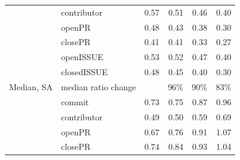 \documentclass[smallextended]{svjour3}
\begin{document}
\begin{table}[!t]
\begin{adjustbox}{max width=0.96\textwidth}
\begin{tabular}{llrrrr}
                              & contributor                                 & 0.57                                         & 0.51                          & 0.46                          & 0.40                          \\
                              & openPR                                      & 0.48                                         & 0.43                          & 0.38                          & 0.30                          \\
                              & closePR                                     & 0.41                                         & 0.41                          & 0.33                          & 0.27                          \\
                              & openISSUE                                   & 0.53                                         & 0.52                          & 0.47                          & 0.40                          \\
                              & closedISSUE                                 & 0.48                                         & 0.45                          & 0.40                          & 0.30                          \\
\multirow{-7}{*}{Median, SA}  & \cellcolor[HTML]{CCCCCC}median ratio change & \multicolumn{1}{l}{\cellcolor[HTML]{CCCCCC}} & \cellcolor[HTML]{CCCCCC}96\%  & \cellcolor[HTML]{CCCCCC}90\%  & \cellcolor[HTML]{CCCCCC}83\%  \\ \hline
                              & commit                                      & 0.73                                         & 0.75                          & 0.87                          & 0.96                          \\
                              & contributor                                 & 0.49                                         & 0.50                          & 0.59                          & 0.69                          \\
                              & openPR                                      & 0.67                                         & 0.76                          & 0.91                          & 1.07                          \\
                              & closePR                                     & 0.74                                         & 0.84                          & 0.93                          & 1.04                          \\

\end{tabular}
\end{adjustbox}
\end{table}
\end{document}
